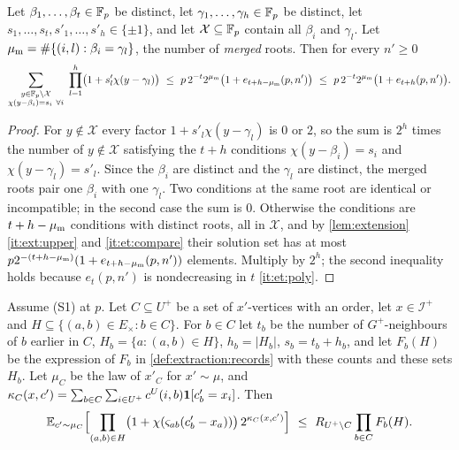 \begin{lemma}\label{lem:extraction-merged-count}
Let $\beta_1,\dots,\beta_t\in\mathbb F_p$ be distinct, let $\gamma_1,\dots,\gamma_h\in\mathbb F_p$
be distinct, let $s_1,\dots,s_t,s'_1,\dots,s'_h\in\{\pm1\}$, and let
$\mathcal X\subseteq\mathbb F_p$ contain all $\beta_i$ and $\gamma_l$. Let
$\mu_{\rm m}=\#\{(i,l):\beta_i=\gamma_l\}$, the number of \emph{merged} roots. Then
for every $n'\ge0$
\[
 \sum_{\substack{y\in\mathbb F_p\setminus\mathcal X\\ \chi(y-\beta_i)=s_i\ \forall i}}
 \ \prod_{l=1}^h\bigl(1+s'_l\chi(y-\gamma_l)\bigr)
 \ \le\ p\,2^{-t}2^{\mu_{\rm m}}\bigl(1+e_{t+h-\mu_{\rm m}}(p,n')\bigr)
 \ \le\ p\,2^{-t}2^{\mu_{\rm m}}\bigl(1+e_{t+h}(p,n')\bigr).
\]
\end{lemma}

\begin{proof}
For $y\notin\mathcal X$ every factor $1+s'_l\chi(y-\gamma_l)$ is $0$ or $2$, so the
sum is $2^h$ times the number of $y\notin\mathcal X$ satisfying the $t+h$
conditions $\chi(y-\beta_i)=s_i$ and $\chi(y-\gamma_l)=s'_l$. Since the $\beta_i$
are distinct and the $\gamma_l$ are distinct, the merged roots pair one $\beta_i$
with one $\gamma_l$. Two conditions at the same root are identical or
incompatible; in the second case the sum is $0$. Otherwise the conditions are
$t+h-\mu_{\rm m}$ conditions with distinct roots, all in $\mathcal X$, and by
\cref{lem:extension}\ref{it:ext:upper} and \ref{it:et:compare} their solution set
has at most $p2^{-(t+h-\mu_{\rm m})}(1+e_{t+h-\mu_{\rm m}}(p,n'))$ elements.
Multiply by $2^h$; the second inequality holds because $e_t(p,n')$ is
nondecreasing in $t$ \ref{it:et:poly}.
\end{proof}

\begin{lemma}\label{lem:extraction-rows}
Assume \textup{(S1)} at $p$. Let $C\subseteq U^+$ be a set of $x'$-vertices with an
order, let $x\in\mathcal I^+$ and $H\subseteq\{(a,b)\in E_\times:b\in C\}$. For
$b\in C$ let $t_b$ be the number of $G^+$-neighbours of $b$ earlier in $C$,
$H_b=\{a:(a,b)\in H\}$, $h_b=|H_b|$, $s_b=t_b+h_b$, and let $F_b(H)$ be the
expression of $F_b$ in \cref{def:extraction:records} with these counts and these
sets $H_b$. Let $\mu_C$ be the law of
$x'_C$ for $x'\sim\mu$, and
$\kappa_C(x,c')=\sum_{b\in C}\sum_{i\in U^+}c^U(i,b)\mathbf 1[c'_b=x_i]$. Then
\[
 \mathbb E_{c'\sim\mu_C}\Bigl[\prod_{(a,b)\in H}\bigl(1+\chi(\varsigma_{ab}(c'_b-x_a))\bigr)
 \,2^{\kappa_C(x,c')}\Bigr]\ \le\ R_{U^+\setminus C}\prod_{b\in C}F_b(H).
\]
\end{lemma}

